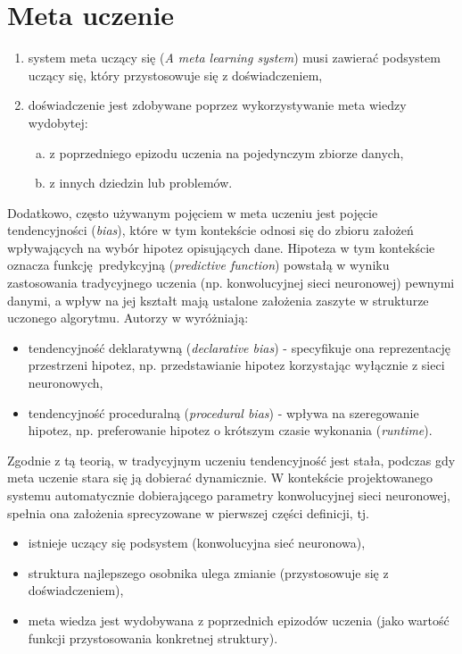\section{Meta uczenie}
\begin{enumerate}
	\item system meta uczący się (\textit{A meta learning system}) musi zawierać podsystem uczący się, który przystosowuje się z doświadczeniem,
	\item doświadczenie jest zdobywane poprzez wykorzystywanie meta wiedzy wydobytej:
	\begin{enumerate}[a)]
		\item z poprzedniego epizodu uczenia na pojedynczym zbiorze danych,
		\item z innych dziedzin lub problemów.
	\end{enumerate}
\end{enumerate}
Dodatkowo, często używanym pojęciem w meta uczeniu jest pojęcie tendencyjności (\textit{bias}), które w tym kontekście odnosi się do zbioru założeń wpływających na wybór hipotez opisujących dane. \cite{Lemke2015}
Hipoteza w tym kontekście oznacza funkcję predykcyjną (\textit{predictive function}) powstałą w wyniku zastosowania tradycyjnego uczenia (np. konwolucyjnej sieci neuronowej) pewnymi danymi, a wpływ na jej kształt mają ustalone założenia zaszyte w strukturze uczonego algorytmu. \cite[s.2]{Brazdil2009}
Autorzy w \cite{Brazdil2009} wyróżniają:
\begin{itemize}
	\item tendencyjność deklaratywną (\textit{declarative bias}) - specyfikuje ona reprezentację przestrzeni hipotez, np. przedstawianie hipotez korzystając wyłącznie z sieci neuronowych,
	\item tendencyjność proceduralną (\textit{procedural bias}) - wpływa na szeregowanie hipotez, np. preferowanie hipotez o krótszym czasie wykonania (\textit{runtime}).
\end{itemize}
Zgodnie z tą teorią, w tradycyjnym uczeniu tendencyjność jest stała, podczas gdy meta uczenie stara się ją dobierać dynamicznie. \cite{Lemke2015}
W kontekście projektowanego systemu automatycznie dobierającego parametry konwolucyjnej sieci neuronowej, spełnia ona założenia sprecyzowane w pierwszej części definicji, tj.
\begin{itemize}
	\item istnieje uczący się podsystem (konwolucyjna sieć neuronowa),
	\item struktura najlepszego osobnika ulega zmianie (przystosowuje się z doświadczeniem),
	\item meta wiedza jest wydobywana z poprzednich epizodów uczenia (jako wartość funkcji przystosowania konkretnej struktury).
\end{itemize}

